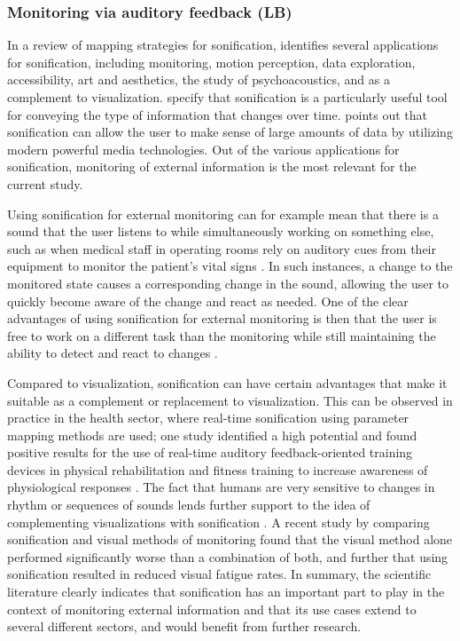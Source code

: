 \documentclass[10pt,a4paper,onecolumn]{article}
\begin{document}
\hypertarget{monitoring-via-auditory-feedback-lb}{%
\subsubsection{Monitoring via auditory feedback (LB)}\label{monitoring-via-auditory-feedback-lb}}

In a review of mapping strategies for sonification, \textcite{dubusSystematicReviewMapping2013} identifies several applications for sonification, including monitoring, motion perception, data exploration, accessibility, art and aesthetics, the study of psychoacoustics, and as a complement to visualization. \textcite{debashiSonificationNetworkTraffic2018} specify that sonification is a particularly useful tool for conveying the type of information that changes over time. \textcite{kramerSonificationReportStatus1999} points out that sonification can allow the user to make sense of large amounts of data by utilizing modern powerful media technologies. Out of the various applications for sonification, monitoring of external information is the most relevant for the current study.

Using sonification for external monitoring can for example mean that there is a sound that the user listens to while simultaneously working on something else, such as when medical staff in operating rooms rely on auditory cues from their equipment to monitor the patient's vital signs \autocite{dubusInteractiveSonificationMotion2013}. In such instances, a change to the monitored state causes a corresponding change in the sound, allowing the user to quickly become aware of the change and react as needed. One of the clear advantages of using sonification for external monitoring is then that the user is free to work on a different task than the monitoring while still maintaining the ability to detect and react to changes \autocite{vickersSonificationProcessMonitoring2011}.

Compared to visualization, sonification can have certain advantages that make it suitable as a complement or replacement to visualization. This can be observed in practice in the health sector, where real-time sonification using parameter mapping methods are used; one study identified a high potential and found positive results for the use of real-time auditory feedback-oriented training devices in physical rehabilitation and fitness training to increase awareness of physiological responses \autocite{yangRealtimeSonificationBiceps2015}. The fact that humans are very sensitive to changes in rhythm or sequences of sounds lends further support to the idea of complementing visualizations with sonification \autocite{hildebrandtShortPaperEnhancing2014}. A recent study by \textcite{debashiSonificationNetworkTraffic2018} comparing sonification and visual methods of monitoring found that the visual method alone performed significantly worse than a combination of both, and further that using sonification resulted in reduced visual fatigue rates. In summary, the scientific literature clearly indicates that sonification has an important part to play in the context of monitoring external information and that its use cases extend to several different sectors, and would benefit from further research.
\end{document}

